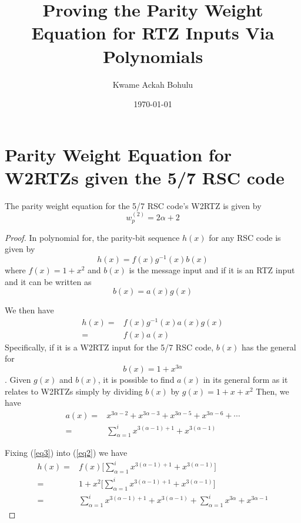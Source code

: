 \documentclass[11pt, oneside, dvipdfmx]{book}
\title{
Proving the Parity Weight Equation for RTZ Inputs Via Polynomials}
\author{Kwame Ackah Bohulu}
\date{\today}
\begin{document}
\maketitle

\newpage

\section{Parity Weight Equation for W2RTZs given the 5/7 RSC code}
\begin{theorem}
The parity weight equation for the 5/7 RSC code's W2RTZ is given by
\begin{equation}
w_p^{(2)} = 2\alpha+2
\end{equation}
\end{theorem}

\begin{proof}
In polynomial for, the parity-bit sequence $h(x)$ for any RSC code is given by 
\begin{equation}
h(x)=f(x)g^{-1}(x)b(x)
\label{eq1}
\end{equation}
where $f(x)=1+x^2$ and $b(x)$ is the message input and if it is an RTZ input and it can be written as
$$b(x)=a(x)g(x)$$

We then have
\begin{equation}
\begin{split}
h(x)=&f(x)g^{-1}(x)a(x)g(x)\\
=&f(x)a(x)
\end{split}
\label{eq2}
\end{equation}
Specifically, if it is a W2RTZ input for the 5/7 RSC code, $b(x)$ has the general for 
$$b(x)=1+x^{3\alpha}$$.
Given $g(x)$ and $b(x)$, it is possible to find $a(x)$ in its general form as it relates to W2RTZs simply by dividing $b(x)$ by $g(x)=1+x+x^2$
Then, we have 
\begin{equation}
\begin{split}
a(x)=&x^{3\alpha-2}+x^{3\alpha-3}+x^{3\alpha-5}+x^{3\alpha-6}+\cdots\\
=&\sum_{\alpha=1}^{i}x^{3(\alpha-1)+1}+x^{3(\alpha-1)}
\end{split}
\label{eq3}
\end{equation}

Fixing (\ref{eq3}) into (\ref{eq2}) we have
\begin{equation}
\begin{split}
h(x)=&f(x)\Big[\sum_{\alpha=1}^{i}x^{3(\alpha-1)+1}+x^{3(\alpha-1)} \Big]\\
=&1+x^2\Big[\sum_{\alpha=1}^{i}x^{3(\alpha-1)+1}+x^{3(\alpha-1)} \Big]\\
=&\sum_{\alpha=1}^{i}x^{3(\alpha-1)+1}+x^{3(\alpha-1)} + \sum_{\alpha=1}^{i}x^{3\alpha}+x^{3\alpha-1}
\end{split}
\end{equation}
\end{proof}
\end{document}
